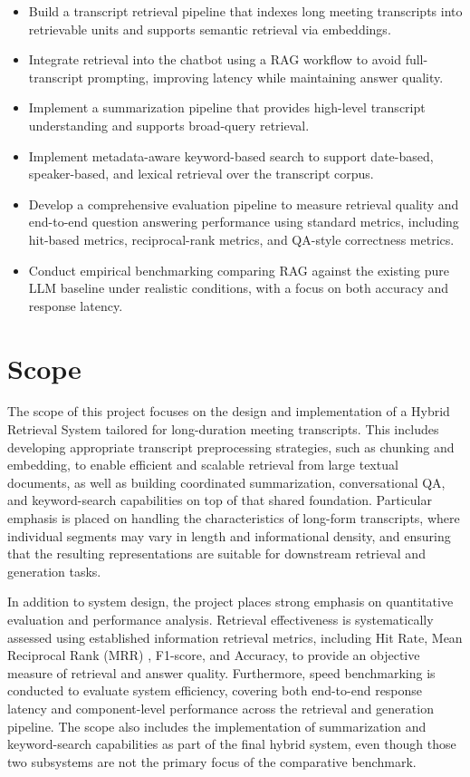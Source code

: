 \begin{itemize}
  \item Build a transcript retrieval pipeline that indexes long meeting transcripts into retrievable units and supports semantic retrieval via embeddings.
  \item Integrate retrieval into the chatbot using a RAG workflow to avoid full-transcript prompting, improving latency while maintaining answer quality.
  \item Implement a summarization pipeline that provides high-level transcript understanding and supports broad-query retrieval.
  \item Implement metadata-aware keyword-based search to support date-based, speaker-based, and lexical retrieval over the transcript corpus.
  \item Develop a comprehensive evaluation pipeline to measure retrieval quality and end-to-end question answering performance using standard metrics, including hit-based metrics, reciprocal-rank metrics, and QA-style correctness metrics.
  \item Conduct empirical benchmarking comparing RAG against the existing pure LLM baseline under realistic conditions, with a focus on both accuracy and response latency.
\end{itemize}

\section{Scope}
The scope of this project focuses on the design and implementation of a Hybrid Retrieval System tailored for long-duration meeting transcripts. This includes developing appropriate transcript preprocessing strategies, such as chunking and embedding, to enable efficient and scalable retrieval from large textual documents, as well as building coordinated summarization, conversational QA, and keyword-search capabilities on top of that shared foundation. Particular emphasis is placed on handling the characteristics of long-form transcripts, where individual segments may vary in length and informational density, and ensuring that the resulting representations are suitable for downstream retrieval and generation tasks.

In addition to system design, the project places strong emphasis on quantitative evaluation and performance analysis. Retrieval effectiveness is systematically assessed using established information retrieval metrics, including Hit Rate, Mean Reciprocal Rank (MRR) \cite{wikipedia2024mrr}, F1-score, and Accuracy, to provide an objective measure of retrieval and answer quality. Furthermore, speed benchmarking is conducted to evaluate system efficiency, covering both end-to-end response latency and component-level performance across the retrieval and generation pipeline. The scope also includes the implementation of summarization and keyword-search capabilities as part of the final hybrid system, even though those two subsystems are not the primary focus of the comparative benchmark.

